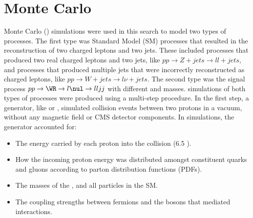 
\section{Monte Carlo}
\label{sec:MC}

Monte Carlo (\MC) simulations were used in this search to model two types of processes.  The first 
type was Standard Model (SM) processes that resulted in the reconstruction of two charged leptons 
and two jets.  These included processes that produced two real charged leptons and two jets, like 
$pp \rightarrow Z+jets \rightarrow ll+jets$, and processes that produced multiple jets that 
were incorrectly reconstructed as charged leptons, like $pp \rightarrow W+jets \rightarrow l\nu+jets$.  
The second type was the \WR signal process $pp \rightarrow \WR \rightarrow l\nul \rightarrow lljj$ 
with different \mWR and \mnul masses.  
\MC simulations of both types of processes were produced using a multi-step procedure.  In the first step, 
a \MC generator, like \PYTHIA or \MADGRAPH, simulated 
collision events between two protons in a vacuum, without any magnetic field or CMS detector 
components.  In simulations, the generator accounted for:

\begin{itemize}
	\item The energy carried by each proton into the collision (6.5 \TeV).
	\item How the incoming proton energy was distributed amongst constituent quarks and gluons according 
		to parton distribution functions (PDFs).
	\item The masses of the \WR, \nul and all particles in the SM.
	\item The coupling strengths between fermions and the bosons that mediated interactions.
\end{itemize}

